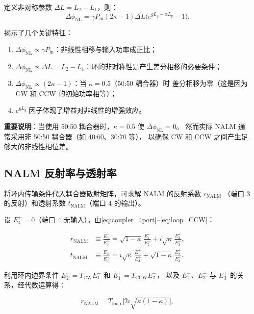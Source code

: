 \documentclass[11pt,a4paper]{ctexart}
\begin{document}
定义非对称参数 $\Delta L = L_2 - L_1$，则：
\begin{equation}
  \boxed{
  \Delta\phi_{\text{NL}} = \gamma P_{\text{in}} (2\kappa - 1) \Delta L
    \bigl(e^{gL_g - \alpha L_g} - 1\bigr)
  }.
  \label{eq:delta_phi_NL_simple}
\end{equation}

 揭示了几个关键特征：

\begin{enumerate}
  \item $\Delta\phi_{\text{NL}} \propto \gamma P_{\text{in}}$：非线性相移与输入功率成正比；
  \item $\Delta\phi_{\text{NL}} \propto \Delta L = L_2 - L_1$：环的非对称性是产生差分相移的必要条件；
  \item $\Delta\phi_{\text{NL}} \propto (2\kappa - 1)$：当 $\kappa = 0.5$（50:50 耦合器）时
        差分相移为零（这是因为 CW 和 CCW 的初始功率相等）；
  \item $e^{gL_g}$ 因子体现了增益对非线性的增强效应。
\end{enumerate}

\textbf{重要说明}：当使用 50:50 耦合器时，$\kappa = 0.5$ 使 $\Delta\phi_{\text{NL}} = 0$。
然而实际 NALM 通常采用非 50:50 耦合器（如 40:60、30:70 等），
以确保 CW 和 CCW 之间产生足够大的非线性相位差。

\subsection{NALM 反射率与透射率}

将环内传输条件代入耦合器散射矩阵，可求解 NALM 的反射系数 $r_{\text{NALM}}$
（端口 3 的反射）和透射系数 $t_{\text{NALM}}$（端口 4 的输出）。

设 $E_4^+ = 0$（端口 4 无输入），由\cref{eq:coupler_4port}--\eqref{eq:loop_CCW}：

\begin{align}
  r_{\text{NALM}} &\equiv \frac{E_3^-}{E_3^+}
  = \sqrt{1-\kappa}\, \frac{E_1^+}{E_3^+} + i\sqrt{\kappa}\, \frac{E_2^+}{E_3^+}, \\[4pt]
  t_{\text{NALM}} &\equiv \frac{E_4^-}{E_3^+}
  = i\sqrt{\kappa}\, \frac{E_1^+}{E_3^+} + \sqrt{1-\kappa}\, \frac{E_2^+}{E_3^+}.
\end{align}

利用环内边界条件 $E_2^+ = T_{\text{CW}} E_1^-$ 和 $E_1^+ = T_{\text{CCW}} E_2^-$，
以及 $E_1^-$、$E_2^-$ 与 $E_3^+$ 的关系，经代数运算得：

\begin{equation}
  \boxed{
  r_{\text{NALM}} = T_{\text{loop}} \,
    \bigl[2i\sqrt{\kappa(1-\kappa)}\bigr],
  }
  \label{eq:r_NALM}
\end{equation}
\end{document}
